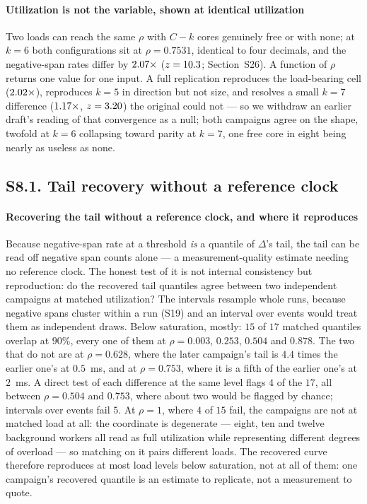 \documentclass[10pt,journal,onecolumn]{IEEEtran}
\begin{document}
\paragraph{Utilization is not the variable, shown at identical utilization} Two loads
can reach the same $\rho$ with $C-k$ cores genuinely free or with none; at $k=6$ both configurations
sit at $\rho = 0.7531$, identical to four decimals, and the negative-span rates differ by
$2.07\times$ ($z=10.3$; Section~S26). A function of $\rho$ returns one value
for one input. A full replication reproduces the load-bearing cell ($2.02\times$),
reproduces $k=5$ in direction but not size, and resolves a small $k=7$ difference
($1.17\times$, $z=3.20$) the original could not --- so we withdraw an earlier draft's
reading of that convergence as a null; both campaigns agree on the shape, twofold at $k=6$ collapsing toward parity at
$k=7$, one free core in eight being nearly as useless as none.

\subsection{S8.1. Tail recovery without a reference clock}
\paragraph{Recovering the tail without a reference clock, and where it reproduces} Because
negative-span rate at a threshold \emph{is} a quantile of $\Delta$'s tail, the tail can be read off
negative span counts alone --- a measurement-quality estimate needing no reference clock. The honest
test of it is not internal consistency but reproduction: do the recovered tail quantiles agree
between two independent campaigns at matched utilization? The intervals resample whole runs,
because negative spans cluster within a run (S19) and an interval over events would treat them
as independent draws. Below saturation, mostly: $15$ of $17$ matched quantiles overlap at
$90\%$, every one of them at $\rho = 0.003$, $0.253$, $0.504$ and $0.878$. The two that do not
are at $\rho = 0.628$, where the later campaign's tail is $4.4$ times the earlier one's at
$0.5$~ms, and at $\rho = 0.753$, where it is a fifth of the earlier one's at $2$~ms. A direct
test of each difference at the same level flags $4$ of the $17$, all between $\rho = 0.504$
and $0.753$, where about two would be flagged by chance; intervals over events fail $5$. At
$\rho = 1$, where $4$ of $15$ fail, the campaigns are not at matched load at all: the coordinate
is degenerate --- eight, ten and twelve background workers all read as full utilization while
representing different degrees of overload --- so matching on it pairs different loads. The
recovered curve therefore reproduces at most load levels below saturation, not at all of them:
one campaign's recovered quantile is an estimate to replicate, not a measurement to quote.
\end{document}
